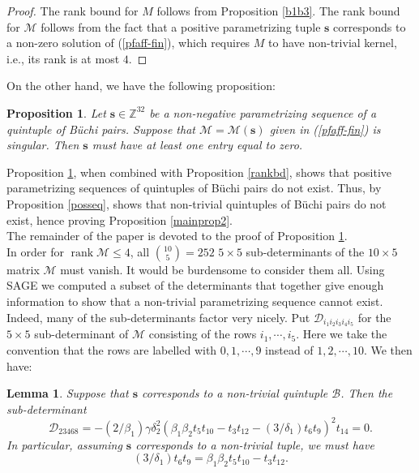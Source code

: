 \documentclass[letterpaper,10pt]{amsart}
\newcommand{\bZ}{{\mathbb{Z}}}
\newcommand{\Bs}{{\mathbf{s}}}
\newcommand{\B}{{\mathcal{B}}}
\newcommand{\D}{{\mathcal{D}}}
\newcommand{\M}{{\mathcal{M}}}
\newcommand{\rank}{\operatorname{rank}}
\newtheorem{proposition}[theorem]{Proposition}
\newtheorem{lemma}[theorem]{Lemma}
\theoremstyle{definition}
\numberwithin{equation}{section}
\begin{document}
\begin{proof} The rank bound for $M$ follows from Proposition \ref{b1b3}. The rank bound for $\M$ follows from the fact that a positive parametrizing tuple $\Bs$ corresponds to a non-zero solution of (\ref{pfaff-fin}), which requires $M$ to have non-trivial kernel, i.e., its rank is at most $4$. 
\end{proof}

On the other hand, we have the following proposition: 

\begin{proposition} \label{contra} Let $\Bs \in \bZ^{32}$ be a non-negative parametrizing sequence of a quintuple of B\"{u}chi pairs. Suppose that $\M = \M(\Bs)$ given in (\ref{pfaff-fin}) is singular. Then $\Bs$ must have at least one entry equal to zero. 
\end{proposition}

Proposition \ref{contra}, when combined with Proposition \ref{rankbd}, shows that positive parametrizing sequences of quintuples of B\"{u}chi pairs do not exist. Thus, by Proposition \ref{posseq}, shows that non-trivial quintuples of B\"{u}chi pairs do not exist, hence proving Proposition \ref{mainprop2}. \\

The remainder of the paper is devoted to the proof of Proposition \ref{contra}. \\

In order for $\rank \M \leq 4$, all $\binom{10}{5} = 252$ $5 \times 5$ sub-determinants of the $10 \times 5$ matrix $\M$ must vanish. It would be burdensome to consider them all. Using SAGE we computed a subset of the determinants that together give enough information to show that a non-trivial parametrizing sequence cannot exist. \\

Indeed, many of the sub-determinants factor very nicely. Put $\D_{i_1 i_2 i_3 i_4 i_5}$ for the $5 \times 5$ sub-determinant of $\M$ consisting of the rows $i_1, \cdots, i_5$. Here we take the convention that the rows are labelled with $0, 1, \cdots, 9$ instead of $1, 2, \cdots, 10$. We then have: 

\begin{lemma} \label{detlem1} Suppose that $\Bs$ corresponds to a non-trivial quintuple $\B$. Then the sub-determinant
\[\D_{23468} = -(2/\beta_1) \gamma \delta_2^2 (\beta_1 \beta_2 t_5 t_{10} - t_3 t_{12} - (3/\delta_1) t_6 t_9)^2  t_{14} = 0.\]
In particular, assuming $\Bs$ corresponds to a non-trivial tuple, we must have 
\begin{equation} \label{ramf1} (3/\delta_1) t_6 t_9 = \beta_1 \beta_2 t_5 t_{10} - t_3 t_{12}.
\end{equation}
\end{lemma}
\end{document}
